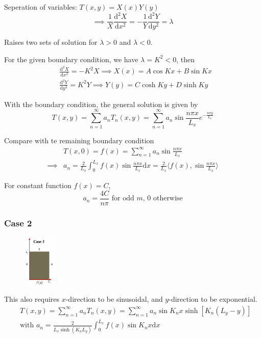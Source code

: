 \documentclass[10pt]{article}
\newcommand{\dd}{\mathrm{d}}
\begin{document}
Seperation of variables: $T(x, y) = X(x)Y(y)$
\[
\implies \frac{1}{X} \frac{\dd^2 X}{\dd x^2} = -\frac{1}{Y} \frac{\dd^2 Y}{\dd y^2} = \lambda
\]

Raises two sets of solution for $\lambda > 0$ and $\lambda < 0$.

For the given boundary condition, we have $\lambda = K^2 < 0$, then
\[
\begin{aligned}
	&\frac{\dd^2 X}{\dd x^2} = -K^2 X \implies X(x) = A \cos Kx + B \sin Kx\\
	&\frac{\dd^2 Y}{\dd y^2} = K^2 Y \implies Y(y) = C \cosh Ky + D \sinh Ky
\end{aligned}
\]

With the boundary condition, the general solution is given by
\[
T(x,y) = \sum_{n=1}^\infty a_n T_n(x,y) = \sum_{n=1}^\infty a_n \sin \frac{n\pi x}{L_x} e^{-\frac{n\pi y}{L_x}}
\]

Compare with te remaining boundary condition
\[
\begin{aligned}
&T(x,0) = f(x) = \sum_{n=1}^\infty a_n \sin \frac{n\pi x}{L_x}\\
\implies &a_n = \frac{2}{L_x} \int_0^{L_x} f(x) \sin \frac{n\pi x}{L_x} \dd x = \frac{2}{L_x} \langle f(x), \sin \frac{n\pi x}{L_x} \rangle
\end{aligned}
\]

For constant function $f(x) = C$,
\[
a_n = \frac{4C}{n\pi} \text{ for odd $m$, 0 otherwise}
\]

\newpage

\subsubsection*{Case 2}
\begin{figure}
	\centering
	\includegraphics[width=0.14\textwidth]{img5-2}
\end{figure}

This also requires $x$-direction to be sinusoidal, and $y$-direction to be exponential.
\[
\begin{aligned}
	&T(x,y) = \sum_{n=1}^\infty a_n T_n(x,y) = \sum_{n=1}^\infty a_n \sin K_n x \sinh [K_n(L_y-y)]\\
	&\text{with } a_n = \frac{2}{L_x \sinh (K_n L_y)} \int_0^{L_x} f(x) \sin K_n x \dd x
\end{aligned}
\]
\end{document}
